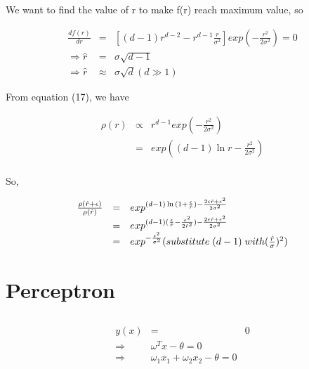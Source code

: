 \documentclass{article} %
\begin{document}
We want to find the value of r to make f(r) reach maximum value, so

\begin{equation}
    \begin{array}{rcl}
      	\frac{df(r)}{dr} & = & [ (d-1)r^{d-2} - r^{d-1} \frac{r}{\sigma ^2} ] exp ( - \frac{r^2}{2 \sigma ^2} ) = 0 \\
	\Rightarrow  \hat{r}& = & \sigma \sqrt{d-1} \\
	\Rightarrow \hat{r} & \approx & \sigma \sqrt{d} (d \gg 1)
    \end{array}
\end{equation}

From equation (17), we have

\begin{equation}
    \begin{array}{rcl}
      	\rho (r) & \propto & r^{d-1} exp ( - \frac{r^2}{2 \sigma ^2} )  \\
	& = & exp((d-1)\ln{r} - \frac{r^2}{2 \sigma ^2}) \\
    \end{array}
\end{equation}

So, 

\begin{equation}
    \begin{array}{rcl}
      	\frac {\rho (\hat{r}+\epsilon)}{\rho ({\hat{r})}} & = & exp^{(d-1)\ln{(1 + \frac{\epsilon}{\hat{r}}}) - \frac{2\epsilon \hat{r} + \epsilon^2}{2\sigma^2} } \\
	& = & exp^{(d-1)(\frac{\epsilon}{\hat{r}} - \frac{\epsilon^2}{2\hat{r}^2} ) -  \frac{2\epsilon \hat{r} + \epsilon^2}{2\sigma^2} }  \\
	& = & exp^{- \frac{\epsilon^2}{\sigma^2} } (substitute \hspace{1mm} (d-1) \hspace{1mm} with (\frac{\hat{r}}{\sigma})^2)
    \end{array}
\end{equation}


\section{Perceptron}
\label{gen_inst}

\subsection{}

\begin{equation}
    \begin{array}{rcl}
      	y(x) & =  & 0 \\
	\Rightarrow &  \omega ^ T x - \theta  = 0 \\
	\Rightarrow & \omega_1 x_1 + \omega_2 x_2 - \theta = 0
    \end{array}
\end{equation}
\end{document}
